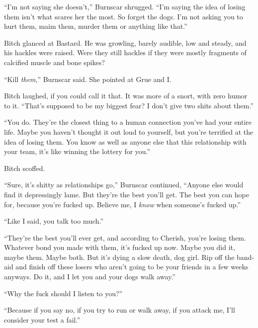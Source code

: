 ``I'm not saying she doesn't,'' Burnscar shrugged.  ``I'm saying the idea of losing them isn't what scares her the most.  So forget the dogs.  I'm not asking you to hurt them, maim them, murder them or anything like that.''



Bitch glanced at Bastard.  He was growling, barely audible, low and steady, and his hackles were raised.  Were they still hackles if they were mostly fragments of calcified muscle and bone spikes?



``Kill \emph{them},'' Burnscar said.  She pointed at Grue and I.



Bitch laughed, if you could call it that.  It was more of a snort, with zero humor to it.  ``That's supposed to be my biggest fear?  I don't give two shits about them.''



``You do.  They're the closest thing to a human connection you've had your entire life.  Maybe you haven't thought it out loud to yourself, but you're terrified at the idea of losing them.  You know as well as anyone else that this relationship with your team, it's like winning the lottery for you.''



Bitch scoffed.



``Sure, it's shitty as relationships go,'' Burnscar continued, ``Anyone else would find it depressingly lame.  But they're the best you'll get.  The best you can hope for, because you're fucked up.  Believe me, I \emph{know} when someone's fucked up.''



``Like I said, you talk too much.''



``They're the best you'll ever get, and according to Cherish, you're losing them.  Whatever bond you made with them, it's fucked up now.  Maybe you did it, maybe them.  Maybe both.  But it's dying a slow death, dog girl.  Rip off the band-aid and finish off these losers who aren't going to be your friends in a few weeks anyways.  Do it, and I let you and your dogs walk away.''



``Why the fuck should I listen to you?''



``Because if you say no, if you try to run or walk away, if you attack me, I'll consider your test a fail.''



